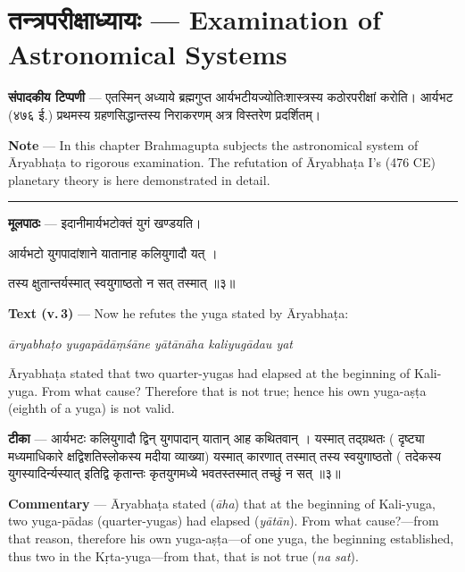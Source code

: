\documentclass[11pt,a4paper]{article}
\newcommand{\dev}[1]{{\devanagarifont #1}}
\newcommand{\skt}[1]{{\devanagarifont\color{sktcolor} #1}}
\newenvironment{bilingual}{%
  \par\noindent
  \begin{minipage}[t]{0.47\textwidth}%
}{%
  \par\end{minipage}%
}
\newcommand{\rightcol}{%
  \par\end{minipage}%
  \hfill
  \begin{minipage}[t]{0.47\textwidth}%
}
\begin{document}
\newpage
\section[\dev{तन्त्रपरीक्षाध्यायः}]{\dev{तन्त्रपरीक्षाध्यायः} --- Examination of Astronomical Systems}

\begin{bilingual}
\textbf{संपादकीय टिप्पणी} --- एतस्मिन् अध्याये ब्रह्मगुप्त आर्यभटीयज्योतिःशास्त्रस्य कठोरपरीक्षां करोति। आर्यभट (४७६ ई.) प्रथमस्य ग्रहणसिद्धान्तस्य निराकरणम् अत्र विस्तरेण प्रदर्शितम्।
\rightcol
\textbf{Note} --- In this chapter Brahmagupta subjects the astronomical system of Āryabhaṭa to rigorous examination. The refutation of Āryabhaṭa I's (476 CE) planetary theory is here demonstrated in detail.
\end{bilingual}

\medskip
\noindent\rule{\textwidth}{0.4pt}

\begin{bilingual}
\textbf{मूलपाठः} --- \skt{इदानीमार्यभटोक्तं युगं खण्डयति}।

\skt{आर्यभटो युगपादांशाने यातानाह कलियुगादौ यत्} ।

\skt{तस्य क्षुतान्तर्यस्मात् स्वयुगाष्ठतो न सत् तस्मात्} ॥३॥
\rightcol
\textbf{Text (v.\,3)} --- Now he refutes the yuga stated by Āryabhaṭa:

\textit{āryabhaṭo yugapādāṃśāne yātānāha kaliyugādau yat}

Āryabhaṭa stated that two quarter-yugas had elapsed at the beginning of Kali-yuga. From what cause? Therefore that is not true; hence his own yuga-aṣṭa (eighth of a yuga) is not valid.
\end{bilingual}

\medskip

\begin{bilingual}
\textbf{टीका} --- \skt{आर्यभटः कलियुगादौ द्विन् युगपादान् यातान् आह कथितवान् । यस्मात् तद्ग्रथतः} (\skt{दृष्ट्या मध्यमाधिकारे क्षद्विशतिस्लोकस्य मदीया व्याख्या}) \skt{यस्मात् कारणात् तस्मात् तस्य स्वयुगाष्ठतो} (\skt{तदेकस्य युगस्यादिर्न्यस्यात् इतिद्वि कृतान्तः कृतयुगमध्ये भवतस्तस्मात् तच्छुं न सत्} ॥३॥
\rightcol
\textbf{Commentary} --- Āryabhaṭa stated (\textit{āha}) that at the beginning of Kali-yuga, two yuga-pādas (quarter-yugas) had elapsed (\textit{yātān}). From what cause?---from that reason, therefore his own yuga-aṣṭa---of one yuga, the beginning established, thus two in the Kṛta-yuga---from that, that is not true (\textit{na sat}).
\end{bilingual}
\end{document}
